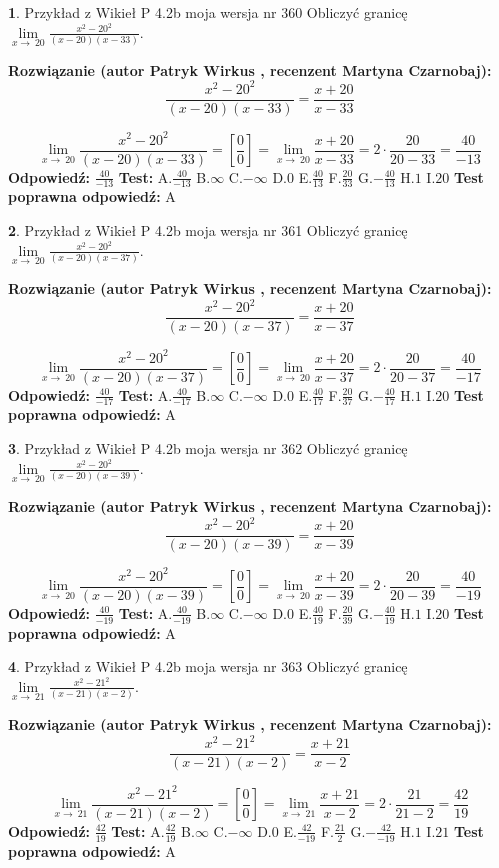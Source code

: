 \documentclass[12pt, a4paper]{article}
\theoremstyle{definition} %
\newtheorem{zad}{}
\newcommand{\zadStart}[1]{\begin{zad}#1\newline}
\newcommand{\zadStop}{\end{zad}}
\newcommand{\rozwStart}[2]{\noindent \textbf{Rozwiązanie (autor #1 , recenzent #2): }\newline}
\newcommand{\rozwStop}{\newline}
\newcommand{\odpStart}{\noindent \textbf{Odpowiedź:}\newline}
\newcommand{\odpStop}{\newline}
\newcommand{\testStart}{\noindent \textbf{Test:}\newline}
\newcommand{\testStop}{\newline}
\newcommand{\kluczStart}{\noindent \textbf{Test poprawna odpowiedź:}\newline}
\newcommand{\kluczStop}{\newline}
\begin{document}
\zadStart{Przykład z Wikieł P 4.2b moja wersja nr 360}
Obliczyć granicę $\lim\limits_{x\to\ 20}\frac{x^{2}-20^{2}}{(x-20)(x-33)}$.
\zadStop
\rozwStart{Patryk Wirkus}{Martyna Czarnobaj}
$$\frac{x^{2}-20^{2}}{(x-20)(x-33)}=\frac{x+20}{x-33}$$

$$\lim\limits_{x\to\ 20}\frac{x^{2}-20^{2}}{(x-20)(x-33)}=[\frac{0}{0}]=\lim\limits_{x\to\ 20}\frac{x+20}{x-33}=2 \cdot \frac{20}{20-33} = \frac{40}{-13}$$
\rozwStop
\odpStart
$\frac{40}{-13}$
\odpStop
\testStart
A.$\frac{40}{-13}$
B.$\infty$
C.$-\infty$
D.$0$
E.$\frac{40}{13}$
F.$\frac{20}{33}$
G.$-\frac{40}{13}$
H.$1$
I.$20$
\testStop
\kluczStart
A
\kluczStop



\zadStart{Przykład z Wikieł P 4.2b moja wersja nr 361}
Obliczyć granicę $\lim\limits_{x\to\ 20}\frac{x^{2}-20^{2}}{(x-20)(x-37)}$.
\zadStop
\rozwStart{Patryk Wirkus}{Martyna Czarnobaj}
$$\frac{x^{2}-20^{2}}{(x-20)(x-37)}=\frac{x+20}{x-37}$$

$$\lim\limits_{x\to\ 20}\frac{x^{2}-20^{2}}{(x-20)(x-37)}=[\frac{0}{0}]=\lim\limits_{x\to\ 20}\frac{x+20}{x-37}=2 \cdot \frac{20}{20-37} = \frac{40}{-17}$$
\rozwStop
\odpStart
$\frac{40}{-17}$
\odpStop
\testStart
A.$\frac{40}{-17}$
B.$\infty$
C.$-\infty$
D.$0$
E.$\frac{40}{17}$
F.$\frac{20}{37}$
G.$-\frac{40}{17}$
H.$1$
I.$20$
\testStop
\kluczStart
A
\kluczStop



\zadStart{Przykład z Wikieł P 4.2b moja wersja nr 362}
Obliczyć granicę $\lim\limits_{x\to\ 20}\frac{x^{2}-20^{2}}{(x-20)(x-39)}$.
\zadStop
\rozwStart{Patryk Wirkus}{Martyna Czarnobaj}
$$\frac{x^{2}-20^{2}}{(x-20)(x-39)}=\frac{x+20}{x-39}$$

$$\lim\limits_{x\to\ 20}\frac{x^{2}-20^{2}}{(x-20)(x-39)}=[\frac{0}{0}]=\lim\limits_{x\to\ 20}\frac{x+20}{x-39}=2 \cdot \frac{20}{20-39} = \frac{40}{-19}$$
\rozwStop
\odpStart
$\frac{40}{-19}$
\odpStop
\testStart
A.$\frac{40}{-19}$
B.$\infty$
C.$-\infty$
D.$0$
E.$\frac{40}{19}$
F.$\frac{20}{39}$
G.$-\frac{40}{19}$
H.$1$
I.$20$
\testStop
\kluczStart
A
\kluczStop



\zadStart{Przykład z Wikieł P 4.2b moja wersja nr 363}
Obliczyć granicę $\lim\limits_{x\to\ 21}\frac{x^{2}-21^{2}}{(x-21)(x-2)}$.
\zadStop
\rozwStart{Patryk Wirkus}{Martyna Czarnobaj}
$$\frac{x^{2}-21^{2}}{(x-21)(x-2)}=\frac{x+21}{x-2}$$

$$\lim\limits_{x\to\ 21}\frac{x^{2}-21^{2}}{(x-21)(x-2)}=[\frac{0}{0}]=\lim\limits_{x\to\ 21}\frac{x+21}{x-2}=2 \cdot \frac{21}{21-2} = \frac{42}{19}$$
\rozwStop
\odpStart
$\frac{42}{19}$
\odpStop
\testStart
A.$\frac{42}{19}$
B.$\infty$
C.$-\infty$
D.$0$
E.$\frac{42}{-19}$
F.$\frac{21}{2}$
G.$-\frac{42}{-19}$
H.$1$
I.$21$
\testStop
\kluczStart
A
\kluczStop
\end{document}
